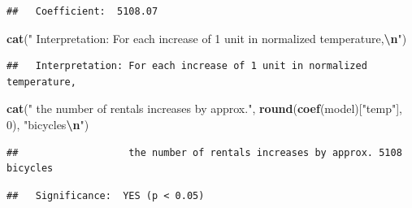 \documentclass[
]{article}
\newenvironment{Shaded}{\begin{snugshade}}{\end{snugshade}}
\newcommand{\ControlFlowTok}[1]{\textcolor[rgb]{0.13,0.29,0.53}{\textbf{#1}}}
\newcommand{\DecValTok}[1]{\textcolor[rgb]{0.00,0.00,0.81}{#1}}
\newcommand{\FloatTok}[1]{\textcolor[rgb]{0.00,0.00,0.81}{#1}}
\newcommand{\FunctionTok}[1]{\textcolor[rgb]{0.13,0.29,0.53}{\textbf{#1}}}
\newcommand{\NormalTok}[1]{#1}
\newcommand{\SpecialCharTok}[1]{\textcolor[rgb]{0.81,0.36,0.00}{\textbf{#1}}}
\newcommand{\StringTok}[1]{\textcolor[rgb]{0.31,0.60,0.02}{#1}}
\begin{document}
\begin{verbatim}
##   Coefficient:  5108.07
\end{verbatim}

\begin{Shaded}
\begin{Highlighting}[]
\FunctionTok{cat}\NormalTok{(}\StringTok{"  Interpretation: For each increase of 1 unit in normalized temperature,}\SpecialCharTok{\textbackslash{}n}\StringTok{"}\NormalTok{)}
\end{Highlighting}
\end{Shaded}

\begin{verbatim}
##   Interpretation: For each increase of 1 unit in normalized temperature,
\end{verbatim}

\begin{Shaded}
\begin{Highlighting}[]
\FunctionTok{cat}\NormalTok{(}\StringTok{"                  the number of rentals increases by approx."}\NormalTok{, }\FunctionTok{round}\NormalTok{(}\FunctionTok{coef}\NormalTok{(model)[}\StringTok{"temp"}\NormalTok{], }\DecValTok{0}\NormalTok{), }\StringTok{"bicycles}\SpecialCharTok{\textbackslash{}n}\StringTok{"}\NormalTok{)}
\end{Highlighting}
\end{Shaded}

\begin{verbatim}
##                   the number of rentals increases by approx. 5108 bicycles
\end{verbatim}

\begin{Shaded}
\end{Shaded}

\begin{verbatim}
##   Significance:  YES (p < 0.05)
\end{verbatim}
\end{document}
